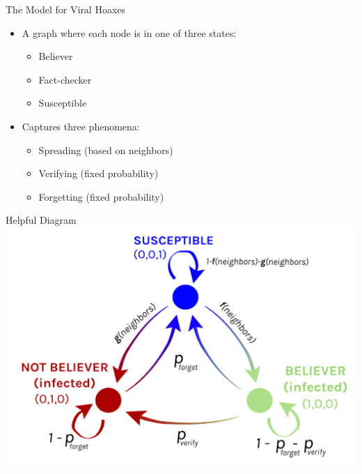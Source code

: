 \documentclass{beamer}
\begin{document}
\begin{frame}{The Model for Viral Hoaxes}
\begin{itemize}
    \item A graph where each node is in one of three states:
    \begin{itemize}
        \item Believer
        \item Fact-checker
        \item Susceptible
    \end{itemize}
    \item Captures three phenomena:
    \begin{itemize}
        \item Spreading (based on neighbors)
        \item Verifying (fixed probability)
        \item Forgetting (fixed probability)
    \end{itemize}
\end{itemize}
\end{frame}

\begin{frame}{Helpful Diagram}
    \includegraphics[width=\linewidth]{fig_1}
\end{frame}
\end{document}
